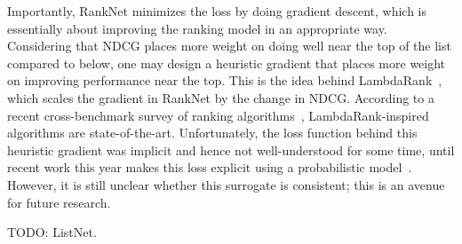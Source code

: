 Importantly, RankNet minimizes the loss by doing gradient descent, which is
essentially about improving the ranking model in an appropriate way. Considering
that NDCG places more weight on doing well near the top of the list compared to
below, one may design a heuristic gradient that places more weight on improving
performance near the top. This is the idea behind LambdaRank~\cite{lambda-rank},
which scales the gradient in RankNet by the change in NDCG. 
According to a recent cross-benchmark survey of ranking
algorithms~\cite{cross-benchmark}, LambdaRank-inspired algorithms are
state-of-the-art. Unfortunately, the loss function behind this heuristic
gradient was implicit and hence not well-understood for some time, until recent
work this year makes this loss explicit using a probabilistic model~\cite{cikm}.
However, it is still unclear whether this surrogate is consistent; this is an
avenue for future research. 

TODO: ListNet.
